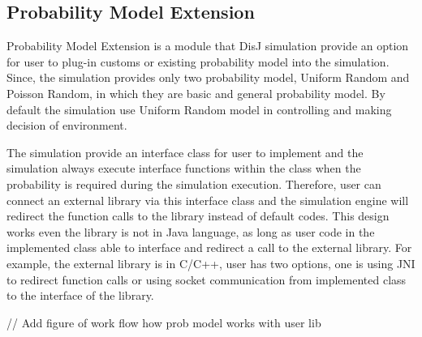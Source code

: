 \subsection{Probability Model Extension}
Probability Model Extension is a module that DisJ simulation provide an option for user to plug-in customs or existing probability model into the simulation. Since, the simulation provides only two probability model, Uniform Random and Poisson Random, in which they are basic and general probability model. By default the simulation use Uniform Random model in controlling and making decision of environment.

The simulation provide an interface class for user to implement and the simulation always execute interface functions within the class when the probability is required during the simulation execution. Therefore, user can connect an external library via this interface class and the simulation engine will redirect the function calls to the library instead of default codes. This design works even the library is not in Java language, as long as user code in the implemented class able to interface and redirect a call to the external library. For example, the external library is in C/C++, user has two options, one is using JNI to redirect function calls or using socket communication from implemented class to the interface of the library.

// Add figure of work flow how prob model works with user lib


